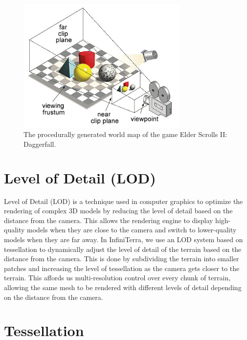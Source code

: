 \documentclass{report}
\begin{document}
\begin{figure}[h!]
	\centering
	\includegraphics[width=0.75\textwidth]{img/frustum.jpg}
	\caption{The procedurally generated world map of the game Elder Scrolls II: Daggerfall.}
	\label{fig:frustum}
\end{figure}

\section{Level of Detail (LOD)}

Level of Detail (LOD) is a technique used in computer graphics to optimize the rendering of complex
3D models by reducing the level of detail based on the distance from the camera. This allows the
rendering engine to display high-quality models when they are close to the camera and switch to
lower-quality models when they are far away. In InfiniTerra, we use an LOD system based on
tessellation to dynamically adjust the level of detail of the terrain based on the distance from
the camera. This is done by subdividing the terrain into smaller patches and increasing the level
of tessellation as the camera gets closer to the terrain. This affords us multi-resolution control
over every chunk of terrain, allowing the same mesh to be rendered with different levels of detail
depending on the distance from the camera.

\section{Tessellation}
\end{document}
